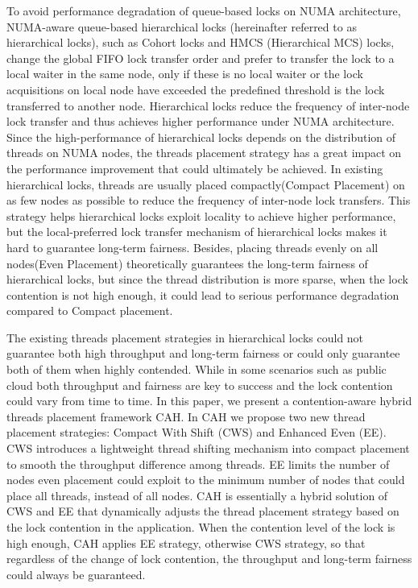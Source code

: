 \begin{englishabstract}
To avoid performance degradation of queue-based locks on NUMA architecture, NUMA-aware queue-based hierarchical locks (hereinafter referred to as hierarchical locks), such as Cohort locks and HMCS (Hierarchical MCS) locks, change the global FIFO lock transfer order and prefer to transfer the lock to a local waiter in the same node, only if these is no local waiter or the lock acquisitions on local node have exceeded the predefined threshold is the lock transferred to another node. Hierarchical locks reduce the frequency of inter-node lock transfer and thus achieves higher performance under NUMA architecture. Since the high-performance of hierarchical locks depends on the distribution of threads on NUMA nodes, the threads placement strategy has a great impact on the performance improvement that could ultimately be achieved. In existing hierarchical locks, threads are usually placed compactly(Compact Placement) on as few nodes as possible to reduce the frequency of inter-node lock transfers. This strategy helps hierarchical locks exploit locality to achieve higher performance, but the local-preferred lock transfer mechanism of hierarchical locks makes it hard to guarantee long-term fairness. Besides, placing threads evenly on all nodes(Even Placement) theoretically guarantees the long-term fairness of hierarchical locks, but since the thread distribution is more sparse, when the lock contention is not high enough, it could lead to serious performance degradation compared to Compact placement.

The existing threads placement strategies in hierarchical locks could not guarantee both high throughput and long-term fairness or could only guarantee both of them when highly contended. While in some scenarios such as public cloud both throughput and fairness are key to success and the lock contention could vary from time to time. In this paper, we present a contention-aware hybrid threads placement framework CAH.   In CAH we propose two new thread placement strategies: Compact With Shift (CWS) and Enhanced Even (EE). CWS introduces a lightweight thread shifting mechanism into compact placement to smooth the throughput difference among threads. EE limits the number of nodes even placement could exploit to the minimum number of nodes that could place all threads, instead of all nodes. CAH is essentially a hybrid solution of CWS and EE that dynamically adjusts the thread placement strategy based on the lock contention in the application. When the contention level of the lock is high enough, CAH applies EE strategy, otherwise CWS strategy, so that regardless of the change of lock contention, the throughput and long-term fairness could always be guaranteed.

\end{englishabstract}


